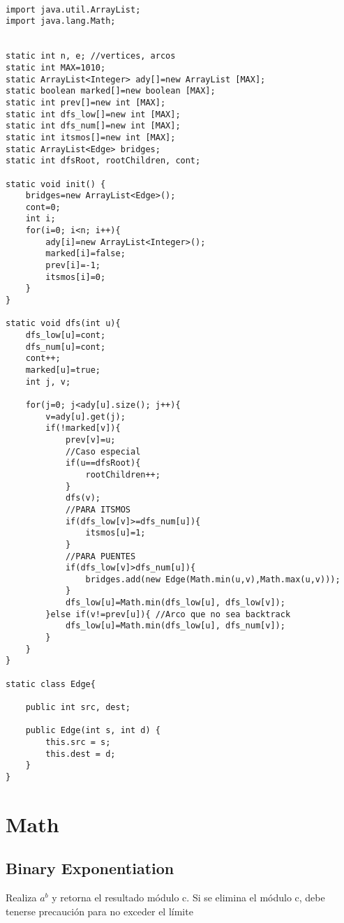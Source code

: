 \documentclass[11pt,letterpaper,twocolumn,twosided]{article}
\begin{document}
\begin{lstlisting}

import java.util.ArrayList;
import java.lang.Math;


static int n, e; //vertices, arcos
static int MAX=1010;     
static ArrayList<Integer> ady[]=new ArrayList [MAX];
static boolean marked[]=new boolean [MAX];
static int prev[]=new int [MAX];
static int dfs_low[]=new int [MAX];
static int dfs_num[]=new int [MAX];
static int itsmos[]=new int [MAX];
static ArrayList<Edge> bridges;
static int dfsRoot, rootChildren, cont;

static void init() {
    bridges=new ArrayList<Edge>();
    cont=0;
    int i;
    for(i=0; i<n; i++){
        ady[i]=new ArrayList<Integer>();
        marked[i]=false;
        prev[i]=-1;
        itsmos[i]=0;
    }
}

static void dfs(int u){
    dfs_low[u]=cont;
    dfs_num[u]=cont;
    cont++;
    marked[u]=true;
    int j, v;

    for(j=0; j<ady[u].size(); j++){
        v=ady[u].get(j);
        if(!marked[v]){
            prev[v]=u;
            //Caso especial 
            if(u==dfsRoot){
                rootChildren++;
            }
            dfs(v);
            //PARA ITSMOS
            if(dfs_low[v]>=dfs_num[u]){
                itsmos[u]=1;
            }
            //PARA PUENTES
            if(dfs_low[v]>dfs_num[u]){
                bridges.add(new Edge(Math.min(u,v),Math.max(u,v)));
            }
            dfs_low[u]=Math.min(dfs_low[u], dfs_low[v]);
        }else if(v!=prev[u]){ //Arco que no sea backtrack
            dfs_low[u]=Math.min(dfs_low[u], dfs_num[v]);
        }
    }
}

static class Edge{

    public int src, dest;
    
    public Edge(int s, int d) {
        this.src = s;
        this.dest = d;
    }
}

\end{lstlisting}

\section{Math}

\subsection{Binary Exponentiation}
Realiza $a^{b}$ y retorna el resultado m\'odulo c. Si se elimina el m\'odulo c, debe tenerse precauci\'on para no exceder el l\'imite
\end{document}
